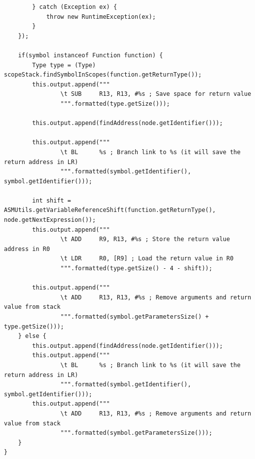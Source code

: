 \documentclass[french,a4paper]{article}
\begin{document}
\begin{lstlisting}
        } catch (Exception ex) {
            throw new RuntimeException(ex);
        }
    });

    if(symbol instanceof Function function) {
        Type type = (Type) scopeStack.findSymbolInScopes(function.getReturnType());
        this.output.append("""
                \t SUB     R13, R13, #%s ; Save space for return value
                """.formatted(type.getSize()));

        this.output.append(findAddress(node.getIdentifier()));

        this.output.append("""
                \t BL      %s ; Branch link to %s (it will save the return address in LR)
                """.formatted(symbol.getIdentifier(), symbol.getIdentifier()));

        int shift = ASMUtils.getVariableReferenceShift(function.getReturnType(), node.getNextExpression());
        this.output.append("""
                \t ADD     R9, R13, #%s ; Store the return value address in R0
                \t LDR     R0, [R9] ; Load the return value in R0
                """.formatted(type.getSize() - 4 - shift));

        this.output.append("""
                \t ADD     R13, R13, #%s ; Remove arguments and return value from stack
                """.formatted(symbol.getParametersSize() + type.getSize()));
    } else {
        this.output.append(findAddress(node.getIdentifier()));
        this.output.append("""
                \t BL      %s ; Branch link to %s (it will save the return address in LR)
                """.formatted(symbol.getIdentifier(), symbol.getIdentifier()));
        this.output.append("""
                \t ADD     R13, R13, #%s ; Remove arguments and return value from stack
                """.formatted(symbol.getParametersSize()));
    }
}
    \end{lstlisting}
\end{document}
